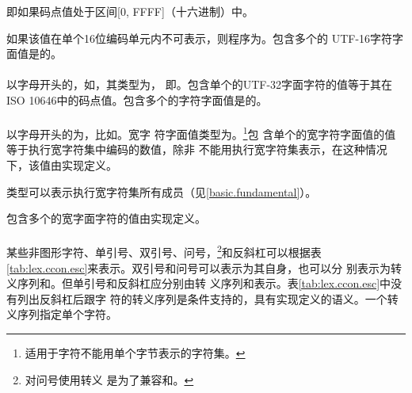 \begin{note} %
  即如果码点值处于区间[0, FFFF]（十六进制）中。
\end{note}

如果该值在单个16位编码单元内不可表示，则程序为\illform{}。包含多个的
UTF-16字符字面值是\illform{}的。

\paragraph{} %
以字母开头的，如，其类型为，
即。包含单个的UTF-32字面字符的值等于其在ISO
10646中的码点值。包含多个的字符字面值是\illform{}的。

\paragraph{} %
以字母开头的为，比如。宽字
符字面值类型为。\footnote{适用于字符不能用单个字节表示的字符集。}包
含单个的宽字符字面值的值等于执行宽字符集中编码的数值，除非
不能用执行宽字符集表示，在这种情况下，该值由实现定义。

\begin{note} %
  类型可以表示执行宽字符集所有成员（见\ref{basic.fundamental}）。
\end{note}

包含多个的宽字面字符的值由实现定义。

\paragraph{} %
某些非图形字符、单引号、双引号、问号，\footnote{对问号使用转义
是为了兼容\isocppfor{}和\isoc{}。}和反斜杠\tm{\bs}可以根据表
\ref{tab:lex.ccon.esc}来表示。双引号和问号可以表示为其自身，也可以分
别表示为转义序列和。但单引号和反斜杠\tm{\bs}应分别由转
义序列和\tm{\bs\bs}表示。表\ref{tab:lex.ccon.esc}中没有列出反斜杠后跟字
符的转义序列是条件支持的，具有实现定义的语义。一个转义序列指定单个字符。

